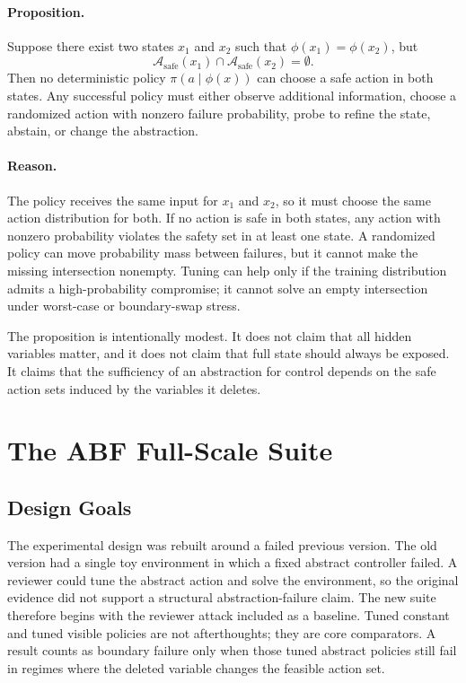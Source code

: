 \documentclass{article}
\newcommand{\suite}{ABF}
\begin{document}
\paragraph{Proposition.}
Suppose there exist two states $x_1$ and $x_2$ such that
$\phi(x_1)=\phi(x_2)$, but
\begin{equation}
    \mathcal{A}_{\mathrm{safe}}(x_1) \cap
    \mathcal{A}_{\mathrm{safe}}(x_2) = \emptyset.
\end{equation}
Then no deterministic policy $\pi(a \mid \phi(x))$ can choose a safe action in
both states. Any successful policy must either observe additional information,
choose a randomized action with nonzero failure probability, probe to refine the
state, abstain, or change the abstraction.

\paragraph{Reason.}
The policy receives the same input for $x_1$ and $x_2$, so it must choose the same
action distribution for both. If no action is safe in both states, any action
with nonzero probability violates the safety set in at least one state. A
randomized policy can move probability mass between failures, but it cannot make
the missing intersection nonempty. Tuning can help only if the training
distribution admits a high-probability compromise; it cannot solve an empty
intersection under worst-case or boundary-swap stress.

The proposition is intentionally modest. It does not claim that all hidden
variables matter, and it does not claim that full state should always be exposed.
It claims that the sufficiency of an abstraction for control depends on the safe
action sets induced by the variables it deletes.

\section{The \suite{} Full-Scale Suite}

\subsection{Design Goals}

The experimental design was rebuilt around a failed previous version. The old
version had a single toy environment in which a fixed abstract controller failed.
A reviewer could tune the abstract action and solve the environment, so the
original evidence did not support a structural abstraction-failure claim. The new
suite therefore begins with the reviewer attack included as a baseline. Tuned
constant and tuned visible policies are not afterthoughts; they are core
comparators. A result counts as boundary failure only when those tuned abstract
policies still fail in regimes where the deleted variable changes the feasible
action set.
\end{document}
